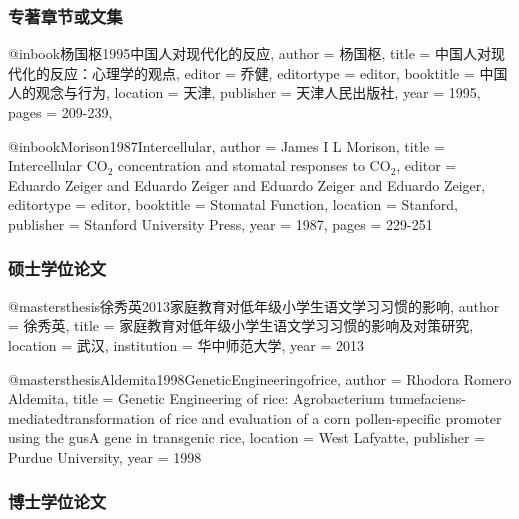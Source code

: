 \subsubsection{专著章节或文集}

\begin{latexexample}
  @inbook{杨国枢1995中国人对现代化的反应,
    author       = {杨国枢},
    title        = {中国人对现代化的反应：心理学的观点},
    editor       = {乔健},
    editortype   = {editor},
    booktitle    = {中国人的观念与行为},
    location     = {天津},
    publisher    = {天津人民出版社},
    year         = {1995},
    pages        = {209-239},
  }

  @inbook{Morison1987Intercellular,
    author       = {James I L Morison},
    title        = {Intercellular $\mathrm{CO}_2$ concentration and stomatal responses to $\mathrm{CO}_2$},
    editor       = {Eduardo Zeiger and Eduardo Zeiger and Eduardo Zeiger and Eduardo Zeiger},
    editortype   = {editor},
    booktitle    = {Stomatal Function},
    location     = {Stanford},
    publisher    = {Stanford University Press},
    year         = {1987},
    pages        = {229-251}
  }
\end{latexexample}


\subsubsection{硕士学位论文}

\begin{latexexample}
  @mastersthesis{徐秀英2013家庭教育对低年级小学生语文学习习惯的影响,
    author       = {徐秀英},
    title        = {家庭教育对低年级小学生语文学习习惯的影响及对策研究},
    location     = {武汉},
    institution  = {华中师范大学},
    year         = {2013}
  }

  @mastersthesis{Aldemita1998GeneticEngineeringofrice,
    author       = {Rhodora Romero Aldemita},
    title        = {Genetic Engineering of rice: Agrobacterium tumefaciens-mediatedtransformation of rice and evaluation of a corn pollen-specific promoter using the gusA gene in transgenic rice},
    location     = {West Lafyatte},
    publisher    = {Purdue University},
    year         = {1998}
  }
\end{latexexample}


\subsubsection{博士学位论文}

